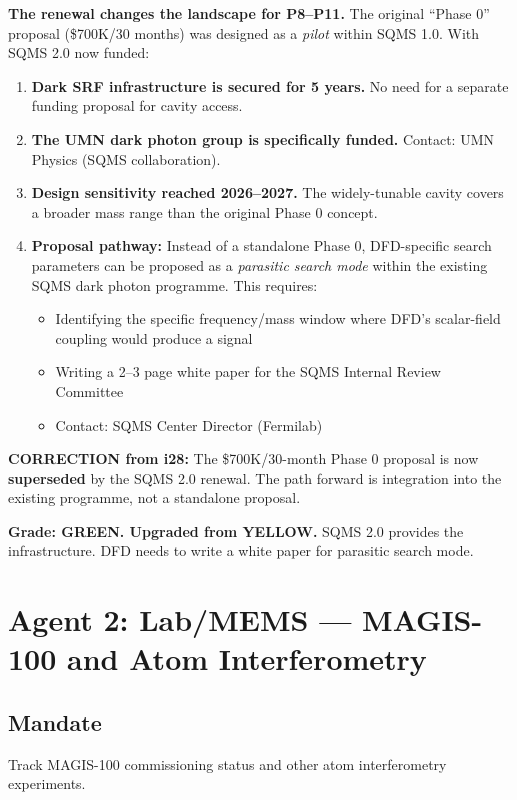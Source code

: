 \documentclass[11pt,a4paper]{article}
\begin{document}
\textbf{The renewal changes the landscape for P8--P11.} The original ``Phase 0'' proposal (\$700K/30 months) was designed as a \emph{pilot} within SQMS 1.0. With SQMS 2.0 now funded:

\begin{enumerate}
\item \textbf{Dark SRF infrastructure is secured for 5 years.} No need for a separate funding proposal for cavity access.
\item \textbf{The UMN dark photon group is specifically funded.} Contact: UMN Physics (SQMS collaboration).
\item \textbf{Design sensitivity reached 2026--2027.} The widely-tunable cavity covers a broader mass range than the original Phase 0 concept.
\item \textbf{Proposal pathway:} Instead of a standalone Phase 0, DFD-specific search parameters can be proposed as a \emph{parasitic search mode} within the existing SQMS dark photon programme. This requires:
\begin{itemize}
\item Identifying the specific frequency/mass window where DFD's scalar-field coupling would produce a signal
\item Writing a 2--3 page white paper for the SQMS Internal Review Committee
\item Contact: SQMS Center Director (Fermilab)
\end{itemize}
\end{enumerate}

\textbf{CORRECTION from i28:} The \$700K/30-month Phase 0 proposal is now \textbf{superseded} by the SQMS 2.0 renewal. The path forward is integration into the existing programme, not a standalone proposal.

\textbf{Grade: GREEN. Upgraded from YELLOW.} SQMS 2.0 provides the infrastructure. DFD needs to write a white paper for parasitic search mode.

\section{Agent 2: Lab/MEMS --- MAGIS-100 and Atom Interferometry}

\subsection{Mandate}
Track MAGIS-100 commissioning status and other atom interferometry experiments.
\end{document}
